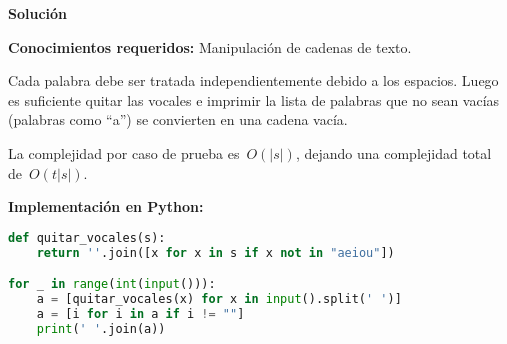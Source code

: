 \vspace*{0cm}
{\Large\textbf{Solución}}

\textbf{Conocimientos requeridos:} Manipulación de cadenas de texto.

Cada palabra debe ser tratada independientemente debido a los espacios. Luego es
suficiente quitar las vocales e imprimir la lista de palabras que no sean vacías
(palabras como ``a'') se convierten en una cadena vacía.

La complejidad por caso de prueba es~$O(|s|)$, dejando una complejidad total
de~$O(t |s|)$.

\textbf{Implementación en Python:}

\begin{lstlisting}[language=Python]
def quitar_vocales(s):
    return ''.join([x for x in s if x not in "aeiou"])

for _ in range(int(input())):
    a = [quitar_vocales(x) for x in input().split(' ')]
    a = [i for i in a if i != ""]
    print(' '.join(a))
\end{lstlisting}

\newpage

